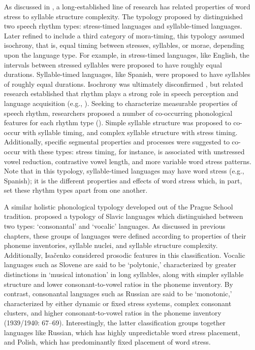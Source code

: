  As discussed in , a long-established line of research has related properties of word stress to syllable structure complexity. The typology proposed by \citet{Pike1945} distinguished two speech rhythm types: stress-timed languages and syllable-timed languages. Later refined to include a third category of mora-timing, this typology assumed isochrony, that is, equal timing between stresses, syllables, or morae, depending upon the language type. For example, in stress-timed languages, like English, the intervals between stressed syllables were proposed to have roughly equal durations. Syllable-timed languages, like Spanish, were proposed to have syllables of roughly equal durations. Isochrony was ultimately disconfirmed \citep{Roach1982}, but related research established that rhythm plays a strong role in speech perception and language acquisition (e.g., \citealt{CutlerMehler1993}). Seeking to characterize measurable properties of speech rhythm, researchers proposed a number of co-occurring phonological features for each rhythm type (\citealt{Dauer1983,Auer1993}). Simple syllable structure was proposed to co-occur with syllable timing, and complex syllable structure with stress timing. Additionally, specific segmental properties and processes were suggested to co-occur with these types: stress timing, for instance, is associated with unstressed vowel reduction, contrastive vowel length, and more variable word stress patterns. Note that in this typology, syllable-timed languages may have word stress (e.g., Spanish); it is the different properties and effects of word stress which, in part, set these rhythm types apart from one another.

  A similar holistic phonological typology developed out of the Prague School tradition. \citet{Isačenko1939/1940} proposed a typology of Slavic languages which distinguished between two types: ‘consonantal’ and ‘vocalic’ languages. As discussed in previous chapters, these groups of languages were defined according to properties of their phoneme inventories, syllable nuclei, and syllable structure complexity. Additionally, Isačenko considered prosodic features in this classification. Vocalic languages such as Slovene are said to be ‘polytonic,’ characterized by greater distinctions in ‘musical intonation’ in long syllables, along with simpler syllable structure and lower consonant-to-vowel ratios in the phoneme inventory. By contrast, consonantal languages such as Russian are said to be ‘monotonic,’ characterized by either dynamic or fixed stress systems, complex consonant clusters, and higher consonant-to-vowel ratios in the phoneme inventory (1939/1940: 67--69). Interestingly, the latter classification groups together languages like Russian, which has highly unpredictable word stress placement, and Polish, which has predominantly fixed placement of word stress.

